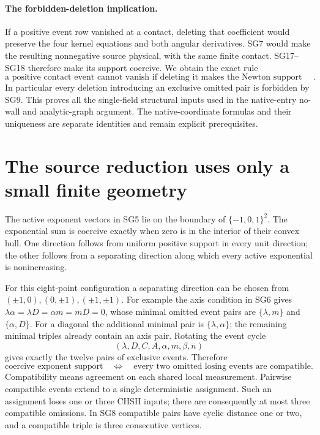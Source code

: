 \paragraph{The forbidden-deletion implication.}
If a positive event row vanished at a contact, deleting that
coefficient would preserve the four kernel equations and both
angular derivatives.  SG7 would make the resulting nonnegative
source physical, with the same finite contact.  SG17--SG18
therefore make its support coercive.  We obtain the exact rule
\[
 \text{a positive contact event cannot vanish if deleting it
 makes the Newton support noncoercive}.                       \tag{SG22}
\]
In particular every deletion introducing an exclusive omitted pair
is forbidden by SG9.  This proves all the single-field structural
inputs used in the native-entry no-wall and analytic-graph argument.
The native-coordinate formulas and their uniqueness are separate
identities and remain explicit prerequisites.

\section{The source reduction uses only a small finite geometry}

The active exponent vectors in SG5 lie on the boundary of
$\{-1,0,1\}^2$.  The exponential sum is coercive exactly when zero
is in the interior of their convex hull.  One direction follows from
uniform positive support in every unit direction; the other follows
from a separating direction along which every active exponential is
nonincreasing.

For this eight-point configuration a separating direction can be
chosen from $(\pm1,0),(0,\pm1),(\pm1,\pm1)$.  For example the axis
condition in SG6 gives
$\lambda\alpha=\lambda D=\alpha m=mD=0$, whose minimal omitted
event pairs are $\{\lambda,m\}$ and $\{\alpha,D\}$.
For a diagonal the additional minimal pair is
$\{\lambda,\alpha\}$; the remaining minimal triples already
contain an axis pair.  Rotating the event cycle
\[
                 (\lambda,D,C,A,\alpha,m,\beta,n)          \tag{SG8}
\]
gives exactly the twelve pairs of exclusive events.  Therefore
\[
 \text{coercive exponent support}\quad\Longleftrightarrow\quad
 \text{every two omitted losing events are compatible}.       \tag{SG9}
\]
Compatibility means agreement on each shared local measurement.
Pairwise compatible events extend to a single deterministic
assignment.  Such an assignment loses one or three CHSH inputs;
there are consequently at most three compatible omissions.
In SG8 compatible pairs have cyclic distance one or two, and a
compatible triple is three consecutive vertices.

